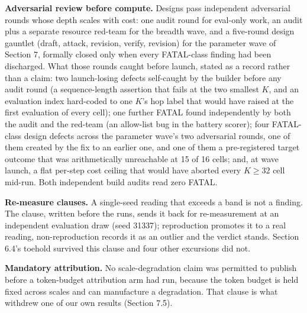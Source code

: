 \textbf{Adversarial review before compute.} Designs pass independent
adversarial rounds whose depth scales with cost: one audit round for
eval-only work, an audit plus a separate resource red-team for the
breadth wave, and a five-round design gauntlet (draft, attack, revision,
verify, revision) for the parameter wave of Section 7, formally closed
only when every FATAL-class finding had been discharged. What those
rounds caught before launch, stated as a record rather than a claim:
two launch-losing defects self-caught by the builder before any audit
round (a sequence-length assertion that fails at the two smallest $K$,
and an evaluation index hard-coded to one $K$'s hop label that would
have raised at the first evaluation of every cell); one further FATAL
found independently by both the audit and the red-team (an allow-list
bug in the battery scorer); four FATAL-class design defects across the
parameter wave's two adversarial rounds, one of them created by the fix
to an earlier one, and one of them a pre-registered target outcome that
was arithmetically unreachable at 15 of 16 cells; and, at wave launch, a
flat per-step cost ceiling that would have aborted every $K \geq 32$
cell mid-run. Both independent build audits read zero FATAL.

\textbf{Re-measure clauses.} A single-seed reading that exceeds a band is not
a finding. The clause, written before the runs, sends it back for
re-measurement at an independent evaluation draw (seed 31337);
reproduction promotes it to a real reading, non-reproduction records it
as an outlier and the verdict stands. Section 6.4's toehold survived
this clause and four other excursions did not.

\textbf{Mandatory attribution.} No scale-degradation claim was permitted to
publish before a token-budget attribution arm had run, because the token
budget is held fixed across scales and can manufacture a degradation.
That clause is what withdrew one of our own results (Section 7.5).

